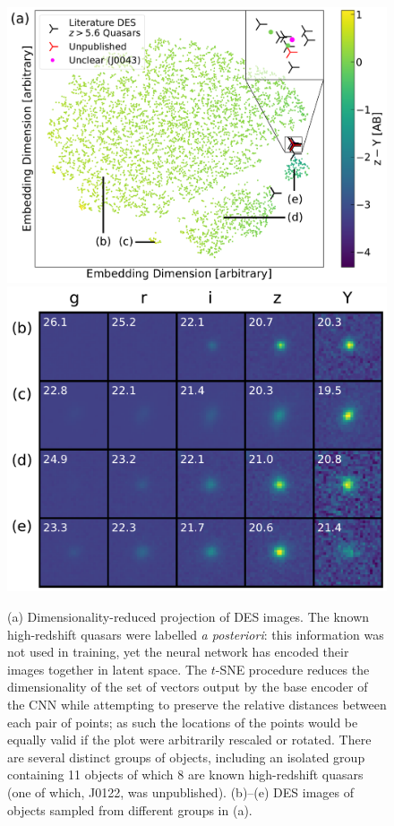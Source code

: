 \documentclass[fleqn,usenatbib]{mnras}
\begin{document}
\begin{figure}
\includegraphics[height=0.4\textheight]{figs/latent_space.pdf}\\
\includegraphics[height=0.5\textheight]{figs/latent_examples.pdf}
\caption{
(a) Dimensionality-reduced projection of DES images.
The known high-redshift quasars were labelled \textit{a posteriori}:
this information was not used in training, yet the neural network has encoded their images together in latent space.
The $t$-SNE procedure reduces the dimensionality of the set of vectors output by the base encoder of the CNN while attempting to preserve the relative distances between each pair of points;
as such the locations of the points would be equally valid if the plot were arbitrarily rescaled or rotated.
There are several distinct groups of objects, including an isolated group containing 11 objects of which 8 are known high-redshift quasars (one of which, J0122, was unpublished).
(b)--(e) DES images of objects sampled from different groups in (a).
}
\label{fig:latent}
\end{figure}
\end{document}
